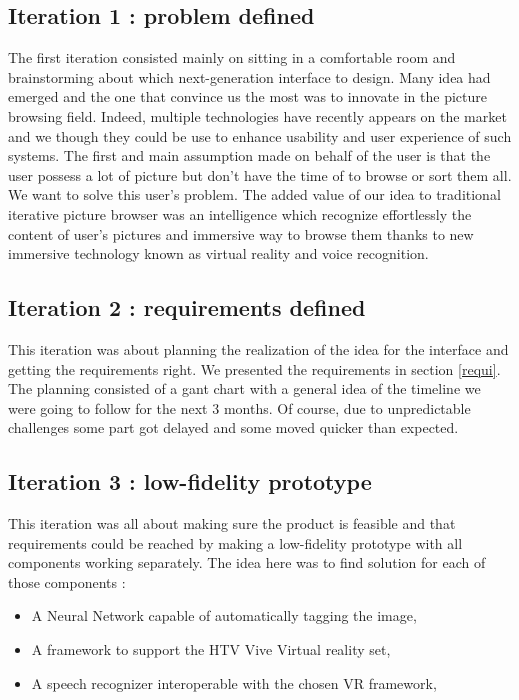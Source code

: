 \documentclass[11pt,a4paper]{article}
\begin{document}
\subsection{Iteration 1 : problem defined}

The first iteration consisted mainly on sitting in a comfortable room and brainstorming about which next-generation interface to design. Many idea had emerged and the one that convince us the most was to innovate in the picture browsing field. Indeed, multiple technologies have recently appears on the market and we though they could be use to enhance usability and user experience of such systems.
The first and main assumption made on behalf of the user is that the user possess a lot of picture but don't have the time of to browse or sort them all. We want to solve this user's problem.
The added value of our idea to traditional iterative picture browser was an intelligence which recognize effortlessly the content of user's pictures and immersive way to browse them thanks to new immersive technology known as virtual reality and voice recognition.

\subsection{Iteration 2 : requirements defined}

This iteration was about planning the realization of the idea for the interface and getting the requirements right. We presented the requirements in section \ref{requi}. The planning consisted of a gant chart with a general idea of the timeline we were going to follow for the next 3 months. Of course, due to unpredictable challenges some part got delayed and some moved quicker than expected.

\subsection{Iteration 3 : low-fidelity prototype}

This iteration was all about making sure the product is feasible and that requirements could be reached by making a low-fidelity prototype with all components working separately.
The idea here was to find solution for each of those components :
\begin{itemize}
	\item A Neural Network capable of automatically tagging the image,
	\item A framework to support the HTV Vive Virtual reality set,
	\item A speech recognizer interoperable with the chosen VR framework,
\end{itemize}
\end{document}
